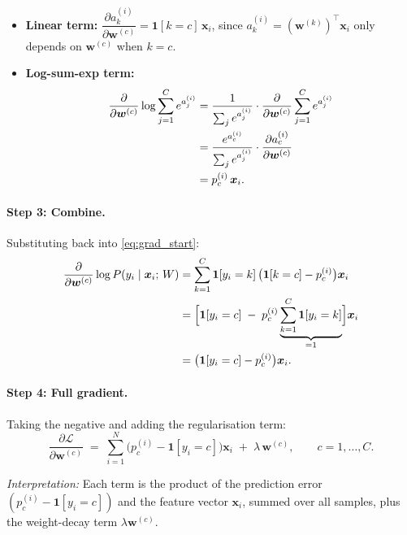 \documentclass[12pt,a4paper]{article}
\newcommand{\bx}{\bm{x}}
\newcommand{\bw}{\bm{w}}
\newcommand{\ind}[1]{\boldsymbol{1}\!\left[#1\right]}
\begin{document}
\begin{itemize}[leftmargin=*]
  \item \textbf{Linear term:}
    $\dfrac{\partial a_k^{(i)}}{\partial \bw^{(c)}}
     = \ind{k = c}\,\bx_i$,
    since $a_k^{(i)} = (\bw^{(k)})^\top\bx_i$ only depends on $\bw^{(c)}$
    when $k = c$.

  \item \textbf{Log-sum-exp term:}
    \begin{align}
      \frac{\partial}{\partial \bw^{(c)}} \log\sum_{j=1}^{C}e^{a_j^{(i)}}
      &= \frac{1}{\sum_{j}e^{a_j^{(i)}}}
         \cdot\frac{\partial}{\partial \bw^{(c)}}
         \sum_{j=1}^{C}e^{a_j^{(i)}} \notag\\
      &= \frac{e^{a_c^{(i)}}}{\sum_{j}e^{a_j^{(i)}}}
         \cdot\frac{\partial a_c^{(i)}}{\partial \bw^{(c)}} \notag\\
      &= p_c^{(i)}\,\bx_i.
    \end{align}
\end{itemize}

\paragraph{Step 3: Combine.}

Substituting back into \eqref{eq:grad_start}:
\begin{align}
  \frac{\partial}{\partial \bw^{(c)}} \log P(y_i \mid \bx_i;\, W)
  &= \sum_{k=1}^{C} \ind{y_i = k}
     \bigl(\ind{k = c} - p_c^{(i)}\bigr)\bx_i \notag\\
  &= \Bigl[\ind{y_i = c}
     \;-\; p_c^{(i)}\underbrace{\sum_{k=1}^{C}\ind{y_i = k}}_{=1}\Bigr]\bx_i \notag\\
  &= \bigl(\ind{y_i = c} - p_c^{(i)}\bigr)\bx_i.
\end{align}

\paragraph{Step 4: Full gradient.}

Taking the negative and adding the regularisation term:
\begin{equation}
  \boxed{
  \frac{\partial \mathcal{L}}{\partial \bw^{(c)}}
  \;=\;
  \sum_{i=1}^{N}\bigl(p_c^{(i)} - \ind{y_i = c}\bigr)\bx_i
  \;+\;
  \lambda\,\bw^{(c)},
  \qquad c = 1, \ldots, C.
  }
  \label{eq:gradient}
\end{equation}

\textit{Interpretation:} Each term is the product of the prediction
error $(p_c^{(i)} - \ind{y_i=c})$ and the feature vector $\bx_i$,
summed over all samples, plus the weight-decay term $\lambda\bw^{(c)}$.
\end{document}

